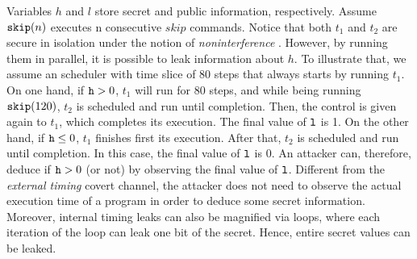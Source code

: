 \documentclass[times, 10pt,twocolumn]{article}
\begin{document}
{Variables $h$ and $l$ store secret and public information,
respectively. 
Assume $\mathtt{skip}(n)$ executes n consecutive $skip$ commands.
Notice that both $t_1$ and $t_2$ are secure in isolation under the
notion of {\em noninterference} \cite{Sabelfeld:Myers:JSAC}.
However, by running them in parallel, it is possible to leak
information about $h$. To illustrate that, we assume 
an scheduler with time slice of 80 steps that  
always starts by running $t_1$.
On one hand, if $\mathtt{h}>0$, $t_1$ will run for $80$ steps, and
while being running $\mathtt{skip}(120)$, $t_2$ is scheduled and 
run until completion. Then, the control is given again to 
$t_1$, which completes its execution. The final value of $\mathtt{l}$
is 1. On the other hand, if $\mathtt{h}\leq 0$, $t_1$ finishes first  
its execution. After that,  $t_2$ is scheduled and run until completion. In
this case, the final value of $\mathtt{l}$ is 0. An attacker can,
therefore, deduce if $\mathtt{h}>0$ (or not) by observing the final
value of $\mathtt{l}$. 
%
Different from the \emph{external timing} covert channel, the attacker does
not need to observe the actual execution time of a program in order to 
deduce some secret information. Moreover, internal timing leaks
can also be magnified via loops, where each
iteration of the loop can leak one bit of the secret. Hence, 
entire secret values can be leaked.


}
\end{document}
